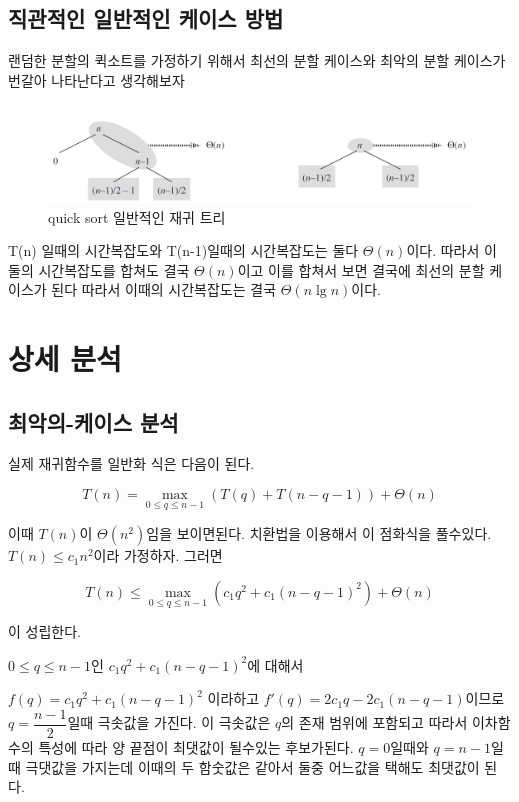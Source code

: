 \documentclass{oblivoir}
\begin{document}
\subsection{직관적인 일반적인 케이스 방법} 

랜덤한 분할의 퀵소트를 가정하기 위해서 최선의 분할 케이스와 최악의 분할 케이스가 번갈아 나타난다고 생각해보자

\begin{figure}[h!]
    \centering
    \includegraphics[scale=0.5]{q3.png}
    \caption{quick sort 일반적인 재귀 트리}
\end{figure}

T(n) 일때의 시간복잡도와 T(n-1)일때의 시간복잡도는 둘다 $\Theta(n)$이다. 따라서 이 둘의 시간복잡도를 합쳐도 결국 $\Theta(n)$이고 이를 합쳐서 보면 결국에 최선의 분할 케이스가 된다 따라서 이때의 시간복잡도는 결국 $\Theta(n \lg n)$이다.

\section{상세 분석}

\subsection{최악의-케이스 분석 }


실제 재귀함수를 일반화 식은 다음이 된다.

$$T(n) = \max_{0 \le q \le n-1}(T(q) + T(n-q-1)) + \Theta(n)$$

이때 $T(n)$이 $\Theta(n^2)$임을 보이면된다.
치환법을 이용해서 이 점화식을 풀수있다.
$T(n) \le c_1n^2$이라 가정하자. 그러면

$$T(n) \le \max_{0 \le q \le n-1}(c_1q^2 + c_1(n-q-1)^2) + \Theta(n)$$

이 성립한다. 

$0 \le q \le n-1$인 $c_1q^2 + c_1(n-q-1)^2$에 대해서 

$f(q) = c_1q^2 + c_1(n-q-1)^2$ 이라하고 $f'(q) = 2c_1q - 2c_1(n-q-1)$이므로 $q=\dfrac{n-1}{2}$일때 극솟값을 가진다. 이 극솟값은 $q$의 존재 범위에 포함되고 따라서 이차함수의 특성에 따라 양 끝점이 최댓값이 될수있는 후보가된다. $q=0$일때와 $q=n-1$일때 극댓값을 가지는데 이때의 두 함숫값은 같아서 둘중 어느값을 택해도 최댓값이 된다.
\end{document}
